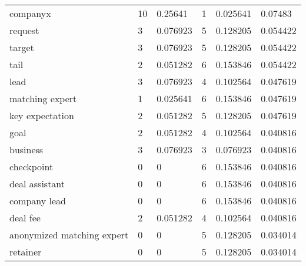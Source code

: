 \begin{landscape}
\begin{longtable}{@{}llllll@{}}
companyx                   & 10         & 0.25641             & 1           & 0.025641             & 0.07483                               \\
request                    & 3          & 0.076923            & 5           & 0.128205             & 0.054422                              \\
target                     & 3          & 0.076923            & 5           & 0.128205             & 0.054422                              \\
tail                       & 2          & 0.051282            & 6           & 0.153846             & 0.054422                              \\
lead                       & 3          & 0.076923            & 4           & 0.102564             & 0.047619                              \\
matching expert            & 1          & 0.025641            & 6           & 0.153846             & 0.047619                              \\
key expectation            & 2          & 0.051282            & 5           & 0.128205             & 0.047619                              \\
goal                       & 2          & 0.051282            & 4           & 0.102564             & 0.040816                              \\
business                   & 3          & 0.076923            & 3           & 0.076923             & 0.040816                              \\
checkpoint                 & 0          & 0                   & 6           & 0.153846             & 0.040816                              \\
deal assistant             & 0          & 0                   & 6           & 0.153846             & 0.040816                              \\
company lead               & 0          & 0                   & 6           & 0.153846             & 0.040816                              \\
deal fee                   & 2          & 0.051282            & 4           & 0.102564             & 0.040816                              \\
anonymized matching expert & 0          & 0                   & 5           & 0.128205             & 0.034014                              \\
retainer                   & 0          & 0                   & 5           & 0.128205             & 0.034014                              \\

\end{longtable}
\end{landscape}
